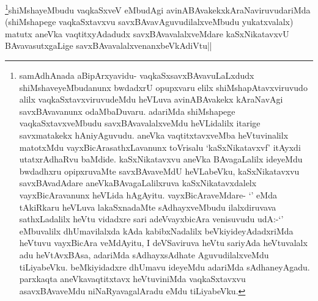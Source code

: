 \begin{artha}
\footnote{samAdhAnada aBipArxyavidu- vaqkaSxsavxBAvavuLaLxdudx shiMshaveyeMbudanunx bwdadxrU opupxvaru elilx shiMshapAtavxviruvudo alilx vaqkaSxtavxviruvudeMdu heVLuva avinABAvakekx kAraNavAgi savxBAvavanunx odaMbaDuvaru. adariMda shiMshapege vaqkaSxtavxveMbudu savxBAvavalalxveMdu heVLidalilx itarige savxmatakekx hAniyAguvudu. aneVka vaqtitxtavxveMba heVtuvinalilx matotxMdu vayxBicArasathxLavanunx toVrisalu `kaSxNikatavxvf' itAyxdi utatxrAdhaRvu baMdide. kaSxNikatavxvu aneVka BAvagaLalilx ideyeMdu bwdadhxru opipxruvaMte savxBAvaveMdU heVLabeVku, kaSxNikatavxvu savxBAvadAdare aneVkaBAvagaLalilxruva kaSxNikatavxdalelx vayxBicAravanunx heVLida hAgAyitu. vayxBicAraveMdare- `\stext' eMda tAkiRkaru heVLuva lakaSxnadaMte sAdhayxveMbudu ilalxdiruvava sathxLadalilx heVtu vidadxre sari adeVvayxbicAra venisuvudu udA:-`\stext' eMbuvalilx dhUmavilalxda kAda kabibxNadalilx beVkiyideyAdadxriMda heVtuvu vayxBicAra veMdAyitu, I deVSaviruva heVtu sariyAda heVtuvalalx adu heVtAvxBAsa, adariMda sAdhayxsAdhate AguvudilalxveMdu tiLiyabeVku. beMkiyidadxre dhUmavu ideyeMdu adariMda sAdhaneyAgadu. parxkaqta aneVkavaqtitxtavx heVtuviniMda vaqkaSxtavxvu asavxBAvaveMdu niNaRyavagalAradu eMdu tiLiyabeVku.}shiMshayeMbudu vaqkaSxveV eMbudAgi avinABAvakekxkAraNaviruvudariMda (shiMshapege vaqkaSxtavxvu savxBAvavAguvudilalxveMbudu yukatxvalalx) matutx aneVka vaqtitxyAdadudx savxBAvavalalxveMdare kaSxNikatavxvU BAvavasutxgaLige savxBAvavalalxvenanxbeVkAdiVtu||
\end{artha}
